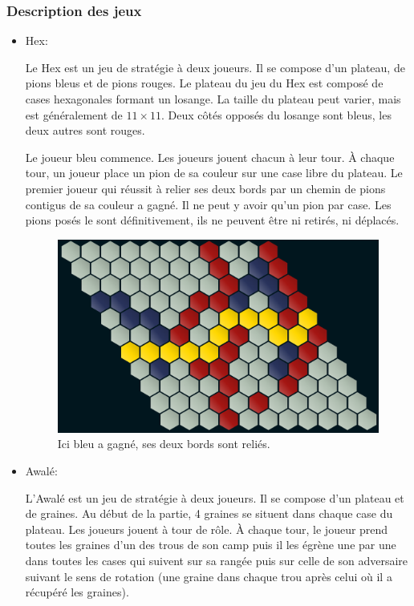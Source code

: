 \subsubsection{Description des jeux}
\begin{itemize}
    \item Hex:
    
    Le Hex est un jeu de stratégie à deux joueurs. Il se compose d'un plateau, de pions bleus
    et de pions rouges. Le plateau du jeu du Hex est composé de cases hexagonales formant un losange. La taille
    du plateau peut varier, mais est généralement de $11\times 11$. Deux côtés opposés du losange sont bleus, les deux 
    autres sont rouges. 

    Le joueur bleu commence. Les joueurs jouent chacun à leur tour. À chaque tour, un joueur place un pion de sa couleur sur une 
    case libre du plateau. Le premier joueur qui réussit à relier ses deux bords par un chemin de pions contigus de sa couleur
    a gagné. Il ne peut y avoir qu'un pion par case. Les pions posés le sont définitivement, ils ne peuvent être ni retirés, ni
    déplacés.\\

    \begin{figure}[!htb]
        \begin{center}
            \includegraphics[scale=0.5]{root/hex_jeu_bleu}
        \end{center}
        \caption{Ici bleu a gagné, ses deux bords sont reliés.}\label{fig:hex_jeu_bleu}
    \end{figure}
    

    \item Awalé:
    
    L'Awalé est un jeu de stratégie à deux joueurs. Il se compose d'un plateau et de graines. Au début de la partie, 4 graines se 
    situent dans chaque case du plateau. Les joueurs jouent à tour de rôle. À chaque tour, le joueur prend toutes les graines d’un 
    des trous de son camp puis il les égrène une par une dans toutes les cases qui suivent sur sa rangée puis sur celle de son adversaire 
    suivant le sens de rotation (une graine dans chaque trou après celui où il a récupéré les graines).


\end{itemize}
